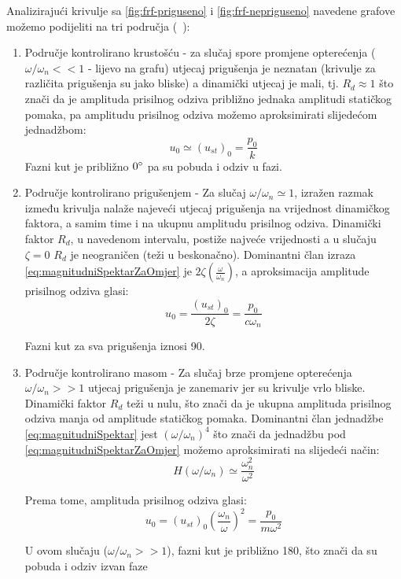 Analizirajući krivulje sa \eqref{fig:frf-priguseno} i \eqref{fig:frf-nepriguseno} 
navedene grafove možemo podijeliti na tri područja (~\cite{chopra2011}):
\begin{enumerate}
    \item Područje kontrolirano krustošću - za slučaj spore promjene opterećenja
        ($\omega/\omega_n<<1$ - lijevo na grafu) utjecaj prigušenja je neznatan
        (krivulje za različita prigušenja su jako bliske) a dinamički utjecaj je mali, 
        tj. $R_d \approx 1$ što znači da je amplituda prisilnog odziva približno jednaka
        amplitudi statičkog pomaka, pa amplitudu prisilnog odziva možemo
        aproksimirati slijedećom jednadžbom:
        \begin{equation}\label{eq:frf_prvi_sektor}
            u_0\simeq(u_{st})_0=\frac{p_0}{k}
        \end{equation}
        Fazni kut je približno $0\degree$ pa su pobuda i odziv u fazi.

    \item Područje kontrolirano prigušenjem - Za slučaj $\omega/\omega_n\simeq 1$,
        izražen razmak između krivulja nalaže najeveći utjecaj prigušenja na
        vrijednost dinamičkog faktora, a samim time i na ukupnu amplitudu prisilnog
        odziva. Dinamički faktor $R_d$, u navedenom intervalu, postiže najveće
        vrijednosti a u slučaju $\zeta=0$ $R_d$ je neograničen (teži u beskonačno). 
        Dominantni član izraza \eqref{eq:magnitudniSpektarZaOmjer} je
        $2\zeta(\frac{\omega}{\omega_n})$, a aproksimacija amplitude prisilnog
        odziva glasi: 
        \begin{equation}\label{eq:frf_rezonanca}
            u_0=\frac{(u_{st})_0}{2\zeta}=\frac{p_0}{c\omega_n}
        \end{equation}

        Fazni kut za sva prigušenja iznosi 90\degree. 

    \item Područje kontrolirano masom - Za slučaj brze promjene opterećenja
        $\omega/\omega_n>>1$ utjecaj prigušenja je zanemariv jer su krivulje vrlo
        bliske. Dinamički faktor $R_d$ teži u nulu, što znači da je ukupna amplituda
        prisilnog odziva manja od amplitude statičkog pomaka. Dominantni član jednadžbe 
        \eqref{eq:magnitudniSpektar} jest $(\omega/\omega_n)^4$ što znači
        da jednadžbu pod \eqref{eq:magnitudniSpektarZaOmjer} možemo aproksimirati na 
        slijedeći način:
        \[
            H(\omega/\omega_n)\simeq \frac{\omega_n^2}{\omega^2}
        \]

        Prema tome, amplituda prisilnog odziva glasi:
        \begin{equation}\label{eq:frf_treci_sektor}
            u_0=(u_{st})_0\left(\frac{\omega_n}{\omega}\right)^2=\frac{p_0}{m\omega^2}
        \end{equation}
        
        U ovom slučaju ($\omega/\omega_n >> 1$), fazni kut je približno 180\degree,
        što znači da su pobuda i odziv izvan faze
\end{enumerate}



